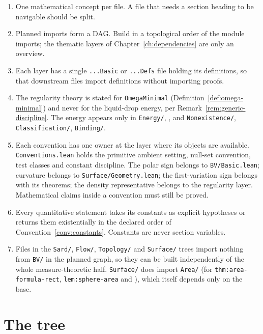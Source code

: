\begin{enumerate}[label=(R\arabic*),leftmargin=*]
\item\label{r:one-concept} One mathematical concept per file.  A file that
  needs a section heading to be navigable should be split.
\item\label{r:leaf-imports} Planned imports form a DAG.  Build in a
  topological order of the module imports; the thematic layers of
  Chapter~\ref{ch:dependencies} are only an overview.
\item\label{r:interface} Each layer has a single \texttt{...Basic} or
  \texttt{...Defs} file holding its definitions, so that downstream files
  import definitions without importing proofs.
\item\label{r:generic} The regularity theory is stated for
  \texttt{OmegaMinimal} (Definition~\ref{def:omega-minimal}) and never for the
  liquid-drop energy, per Remark~\ref{rem:generic-discipline}.  The energy
  appears only in \texttt{Energy/}, , and
  \texttt{Nonexistence/}, \texttt{Classification/}, \texttt{Binding/}.
\item\label{r:conventions} Each convention has one owner at the layer where
  its objects are available.  \texttt{Conventions.lean} holds the primitive
  ambient setting, null-set convention, test classes and constant discipline.
  The polar sign belongs to \texttt{BV/Basic.lean}; curvature belongs to
  \texttt{Surface/Geometry.lean}; the first-variation sign belongs with its
  theorems; the density representative belongs to the regularity layer.
  Mathematical claims inside a convention must still be proved.
\item\label{r:constants} Every quantitative statement takes its constants as
  explicit hypotheses or returns them existentially in the declared order of
  Convention~\ref{conv:constants}.  Constants are never section variables.
\item\label{r:no-heavy-defs} Files in the \texttt{Sard/}, \texttt{Flow/},
  \texttt{Topology/} and \texttt{Surface/} trees import nothing from
  \texttt{BV/} in the planned graph, so they can be built independently of the whole
  measure-theoretic half.  \texttt{Surface/} does import \texttt{Area/}
  (for \texttt{thm:area-formula-rect}, \texttt{lem:sphere-area} and
  ), which itself depends only on the
  base.
\end{enumerate}

\section{The tree}

